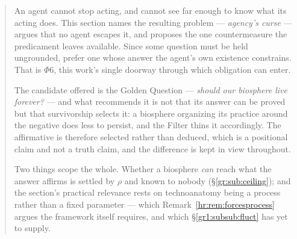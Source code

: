 \documentclass[11pt]{article}
\numberwithin{equation}{section}
\theoremstyle{plain}
\theoremstyle{definition}
\theoremstyle{remark}
\begin{document}
\begin{quote}\small
An agent cannot stop acting, and cannot see far enough to know what its
acting does. This section names the resulting problem --- \emph{agency's
curse} --- argues that no agent escapes it, and proposes the one
countermeasure the predicament leaves available. Since some question
must be held ungrounded, prefer one whose answer the agent's own
existence constrains. That is $\Phi6$, this work's single doorway
through which obligation can enter.

The candidate offered is the Golden Question --- \emph{should our
biosphere live forever?} --- and what recommends it is not that its
answer can be proved but that survivorship selects it: a biosphere
organizing its practice around the negative does less to persist, and
the Filter thins it accordingly. The affirmative is therefore selected
rather than deduced, which is a positional claim and not a truth claim,
and the difference is kept in view throughout.

Two things scope the whole. Whether a biosphere \emph{can} reach what
the answer affirms is settled by $\rho$ and known to nobody
(\S\ref{gr:sub:ceiling}); and the section's practical relevance rests on technoanatomy being a
process rather than a fixed parameter --- which
Remark~\ref{hr:rem:forcesprocess} argues the framework itself requires,
and which \S\ref{gr1:subsub:fluct} has yet to supply.
\end{quote}

\end{document}
